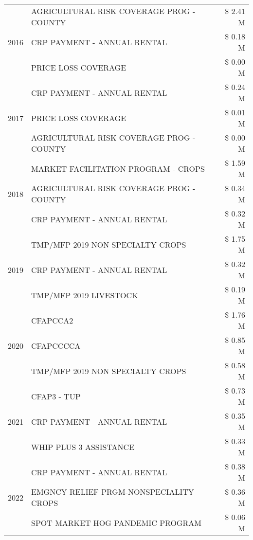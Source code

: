 \begin{tabular}{llr}
\cline{1-3}
\multirow[t]{3}{*}{2016} & AGRICULTURAL RISK COVERAGE PROG - COUNTY & \$ 2.41 M \\
 & CRP PAYMENT - ANNUAL RENTAL & \$ 0.18 M \\
 & PRICE LOSS COVERAGE & \$ 0.00 M \\
\cline{1-3}
\multirow[t]{3}{*}{2017} & CRP PAYMENT - ANNUAL RENTAL & \$ 0.24 M \\
 & PRICE LOSS COVERAGE & \$ 0.01 M \\
 & AGRICULTURAL RISK COVERAGE PROG - COUNTY & \$ 0.00 M \\
\cline{1-3}
\multirow[t]{3}{*}{2018} & MARKET FACILITATION PROGRAM - CROPS & \$ 1.59 M \\
 & AGRICULTURAL RISK COVERAGE PROG - COUNTY & \$ 0.34 M \\
 & CRP PAYMENT - ANNUAL RENTAL & \$ 0.32 M \\
\cline{1-3}
\multirow[t]{3}{*}{2019} & TMP/MFP 2019 NON SPECIALTY CROPS & \$ 1.75 M \\
 & CRP PAYMENT - ANNUAL RENTAL & \$ 0.32 M \\
 & TMP/MFP 2019 LIVESTOCK & \$ 0.19 M \\
\cline{1-3}
\multirow[t]{3}{*}{2020} & CFAPCCA2 & \$ 1.76 M \\
 & CFAPCCCCA & \$ 0.85 M \\
 & TMP/MFP 2019 NON SPECIALTY CROPS & \$ 0.58 M \\
\cline{1-3}
\multirow[t]{3}{*}{2021} & CFAP3 - TUP & \$ 0.73 M \\
 & CRP PAYMENT - ANNUAL RENTAL & \$ 0.35 M \\
 & WHIP PLUS 3 ASSISTANCE & \$ 0.33 M \\
\cline{1-3}
\multirow[t]{3}{*}{2022} & CRP PAYMENT - ANNUAL RENTAL & \$ 0.38 M \\
 & EMGNCY RELIEF PRGM-NONSPECIALITY CROPS & \$ 0.36 M \\
 & SPOT MARKET HOG PANDEMIC PROGRAM & \$ 0.06 M \\
\cline{1-3}
\bottomrule
\end{tabular}
